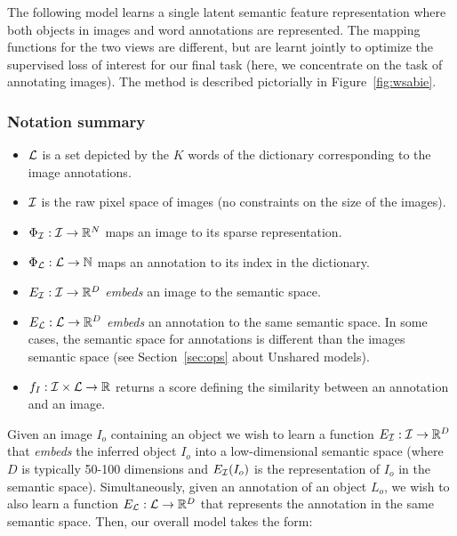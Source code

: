 The following model learns a single latent semantic feature representation 
where both objects in images and word annotations  are represented.
The mapping functions for the two views are different, but are learnt jointly
to optimize the supervised loss of interest for our final task (here, we concentrate on the task 
of annotating images). The method is described pictorially in Figure~\ref{fig:wsabie}.


\subsubsection*{Notation summary}

\begin{itemize}

\item ${\cal L}$ is a set depicted by the $K$ words of the
dictionary corresponding to the image annotations.

\item ${\cal I}$ is the raw pixel space of images (no constraints on the size
of the images).

\item $\Phi_{\cal I} : {\cal I}\rightarrow {\mathbb R}^{N}$ maps an image to
its sparse representation.

\item $\Phi_{\cal L} : {\cal L}\rightarrow {\mathbb N}$ maps an annotation to its
index in the dictionary.

\item $E_{\cal I} : {\cal I} \rightarrow {\mathbb R}^{D}$ {\it embeds} an
image to the semantic space.

\item $E_{\cal L} : {\cal L} \rightarrow {\mathbb R}^{D}$ {\it embeds} an
annotation to the same semantic space. In some cases, the semantic space for
annotations is different than the images semantic space (see
Section~\ref{sec:ops} about Unshared models).

\item $f_I : {\cal I} \times {\cal L} \rightarrow {\mathbb R}$ returns a score
defining the similarity between an annotation and an image.

\end{itemize}



Given an image $I_o$ containing an object we wish to learn a function 
$E_{\cal I} : {\cal I} \rightarrow {\mathbb R}^{D}$ that {\em embeds} the inferred
object $I_o$ into a low-dimensional semantic space (where $D$ is typically
50-100 dimensions and $E_{\cal I}(I_o)$ is the representation of $I_o$ in the
semantic space).  Simultaneously, given an annotation of an object $L_o$, we
wish to also learn a function $E_{\cal L} : {\cal L}  \rightarrow {\mathbb
R}^{D}$ that represents the annotation in the same semantic space.  Then, our
overall model takes the form: 

